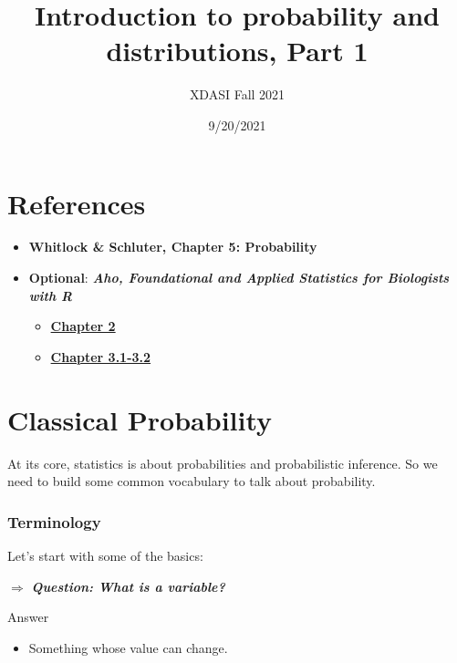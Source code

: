 \documentclass[
]{article}
\title{Introduction to probability and distributions, Part 1}
\subtitle{XDASI Fall 2021}
\author{}
\date{\vspace{-2.5em}9/20/2021}
\providecommand{\tightlist}{%
  \setlength{\itemsep}{0pt}\setlength{\parskip}{0pt}}
\begin{document}
\maketitle

{
\setcounter{tocdepth}{3}
\tableofcontents
}
\hypertarget{references}{%
\section{References}\label{references}}

\begin{itemize}
\tightlist
\item
  \textbf{Whitlock \& Schluter, Chapter 5: Probability}
\item
  \textbf{Optional}: \textbf{\emph{Aho, Foundational and Applied
  Statistics for Biologists with R}}

  \begin{itemize}
  \tightlist
  \item
    \href{https://drive.google.com/file/d/1cpC3ofcP9DIB8vDieE1lBVVAesWklCyM/view?usp=sharing}{\textbf{Chapter
    2}}
  \item
    \href{https://drive.google.com/file/d/1ck7QGKh1TS_lo_BCjBHMk4LSB-TO2sEN/view?usp=sharing}{\textbf{Chapter
    3.1-3.2}}
  \end{itemize}
\end{itemize}

\hypertarget{classical-probability}{%
\section{Classical Probability}\label{classical-probability}}

At its core, statistics is about probabilities and probabilistic
inference. So we need to build some common vocabulary to talk about
probability.

\hypertarget{terminology}{%
\subsubsection{Terminology}\label{terminology}}

Let's start with some of the basics:

\(\Rightarrow\) \textbf{\emph{Question: What is a variable?}}

Answer

\begin{itemize}
\tightlist
\item
  Something whose value can change.
\end{itemize}
\end{document}
